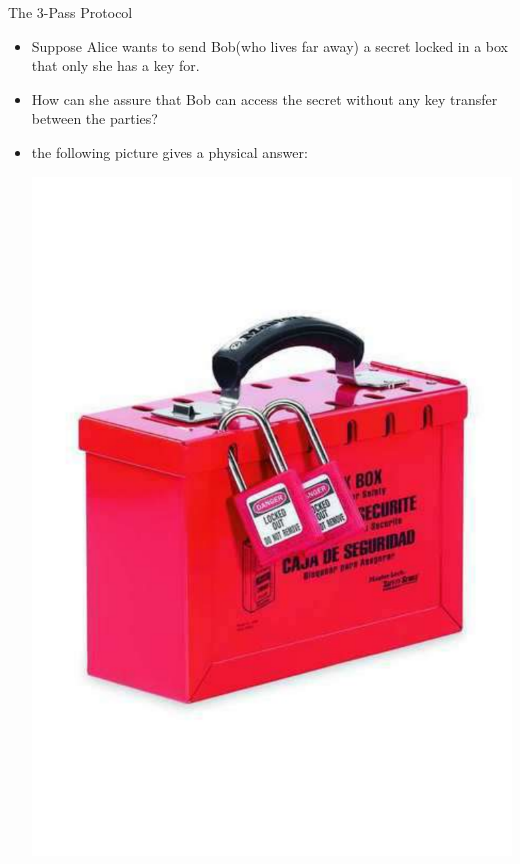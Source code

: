 \documentclass[ %
 usenames,dvipsnames,
aspectratio=169,11pt ]{beamer}
\newenvironment{stepitemize}{\begin{itemize}[<+->]}{\end{itemize} }
\begin{document}
\begin{frame}{The $3$-Pass Protocol}
    \begin{stepitemize}
    \item Suppose Alice wants to send Bob(who lives far away) a secret locked in a box that only she has a key for.
    \item How can she assure that Bob can access the secret without any key transfer between the parties?
    \item the following picture gives a physical answer:
   \begin{center}
    \includegraphics[scale=.18]{Z10BLufo5oy.pdf}
    \end{center}
    \end{stepitemize}
\end{frame}
\end{document}

